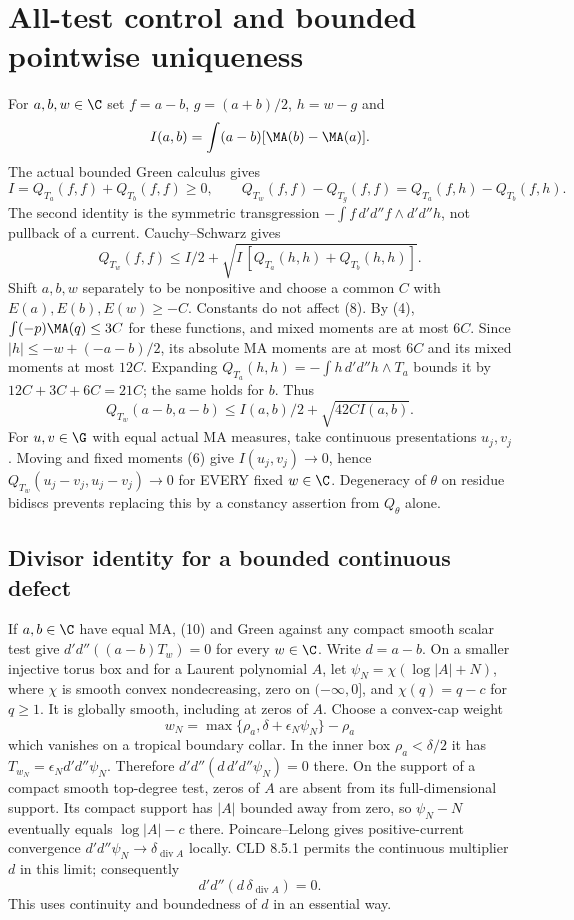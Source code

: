 \section{All-test control and bounded pointwise uniqueness}
For $a,b,w\in\C$ set $f=a-b$, $g=(a+b)/2$, $h=w-g$ and
\[
 I(a,b)=\int(a-b)[\MA(b)-\MA(a)].
\]
The actual bounded Green calculus gives
\[
 I=Q_{T_a}(f,f)+Q_{T_b}(f,f)\ge0,
\qquad
 Q_{T_w}(f,f)-Q_{T_g}(f,f)
   =Q_{T_a}(f,h)-Q_{T_b}(f,h).                              \tag{8}
\]
The second identity is the symmetric transgression
$-\int f\,d'd''f\wedge d'd''h$, not pullback of a current.
Cauchy--Schwarz gives
\[
 Q_{T_w}(f,f)\le I/2+
 \sqrt{I\,[Q_{T_a}(h,h)+Q_{T_b}(h,h)]}.                     \tag{9}
\]
Shift $a,b,w$ separately to be nonpositive and choose a common $C$ with
$E(a),E(b),E(w)\ge-C$. Constants do not affect (8).
By (4), $\int(-p)\MA(q)\le3C$ for these functions, and mixed moments are
at most $6C$. Since $|h|\le-w+(-a-b)/2$, its absolute MA moments are
at most $6C$ and its mixed moments at most $12C$.
Expanding $Q_{T_a}(h,h)=-\int h\,d'd''h\wedge T_a$ bounds it by
$12C+3C+6C=21C$; the same holds for $b$. Thus
\[
 Q_{T_w}(a-b,a-b)\le I(a,b)/2+\sqrt{42C I(a,b)}.             \tag{10}
\]
For $u,v\in\G$ with equal actual MA measures, take continuous presentations
$u_j,v_j$. Moving and fixed moments (6) give $I(u_j,v_j)\to0$, hence
$Q_{T_w}(u_j-v_j,u_j-v_j)\to0$ for EVERY fixed $w\in\C$.
Degeneracy of $\theta$ on residue bidiscs prevents replacing this by a
constancy assertion from $Q_\theta$ alone.

\subsection{Divisor identity for a bounded continuous defect}
If $a,b\in\C$ have equal MA, (10) and Green against any compact smooth
scalar test give $d'd''((a-b)T_w)=0$ for every $w\in\C$.
Write $d=a-b$. On a smaller injective torus box and for a Laurent polynomial
$A$, let $\psi_N=\chi(\log|A|+N)$, where $\chi$ is smooth convex
nondecreasing, zero on $(-\infty,0]$, and $\chi(q)=q-c$ for $q\ge1$.
It is globally smooth, including at zeros of $A$.
Choose a convex-cap weight
\[
 w_N=\max\{\rho_a,\delta+\epsilon_N\psi_N\}-\rho_a
\]
which vanishes on a tropical boundary collar. In the inner box
$\rho_a<\delta/2$ it has $T_{w_N}=\epsilon_Nd'd''\psi_N$.
Therefore $d'd''(d\,d'd''\psi_N)=0$ there.
On the support of a compact smooth top-degree test, zeros of $A$ are absent
from its full-dimensional support. Its compact support has $|A|$ bounded
away from zero, so $\psi_N-N$ eventually equals $\log|A|-c$ there.
Poincare--Lelong gives positive-current convergence
$d'd''\psi_N\to\delta_{\operatorname{div}A}$ locally.
CLD 8.5.1 permits the continuous multiplier $d$ in this limit; consequently
\[
 d'd''(d\,\delta_{\operatorname{div}A})=0.                  \tag{11}
\]
This uses continuity and boundedness of $d$ in an essential way.

